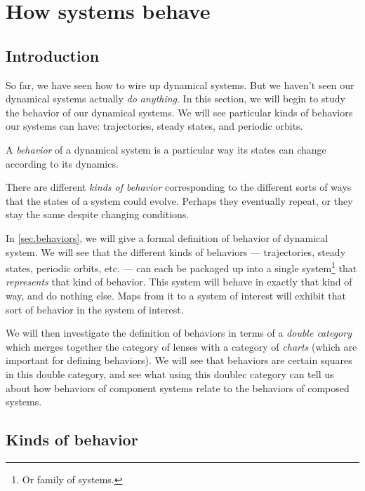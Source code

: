 \documentclass[DynamicalBook]{subfiles}
\begin{document}
%


\setcounter{chapter}{2}%


\chapter{How systems behave}\label{chapter.2}

\section{Introduction}

So far, we have seen how to wire up dynamical systems. But we haven't seen our
dynamical systems actually \emph{do anything}. In this section, we will begin to
study the behavior of our dynamical systems. We will see particular kinds of
behaviors our systems can have:
trajectories, steady states, and periodic orbits.

\begin{informal}
  A \emph{behavior} of a dynamical system is a particular way its states can
  change according to its dynamics.  

  There are different \emph{kinds of behavior} corresponding to the different
  sorts of ways that the states of a system could evolve. Perhaps they eventually
  repeat, or they stay the same despite changing conditions.
\end{informal}

In \cref{sec.behaviors}, we will give a formal definition of behavior of
dynamical system. We will see that the different kinds of behaviors ---
trajectories, steady states, periodic orbits, etc. --- can each
be packaged up into a single system\footnote{Or family of systems.} that \emph{represents} that kind of
behavior. This system will behave in exactly that kind of way, and do nothing else. Maps from it to a system of interest will exhibit that sort of behavior in the system of interest.

We will then investigate the definition of behaviors in terms of a \emph{double
  category} which merges together the category of lenses with a category of
\emph{charts} (which are important for defining behaviors). We will see that
behaviors are certain squares in this double category, and see what using this
doublec category can tell us about how behaviors of component systems relate to
the behaviors of composed systems. 


\section{Kinds of behavior}\label{sec.kinds_of_behavior}
\end{document}
